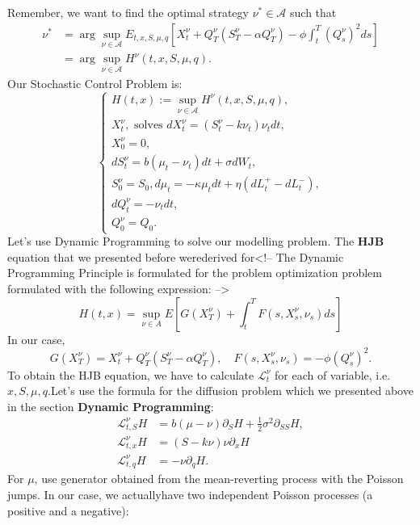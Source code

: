Remember, we want to find the optimal strategy $\nu^* \in \mathcal A$ such that
\begin{align*}
  \nu^* &= \arg\sup_{\nu \in \mathcal A}
  E_{t,x,S,\mu,q}\left[X^\nu_t + Q_T^\nu(S^\nu_T - \alpha Q^\nu_T) - \phi \int_t^T (Q^\nu_s)^2 ds\right]
     \\ &= \arg \sup_{\nu \in \mathcal A}H^\nu(t,x,S,\mu,q).
\end{align*}
Our Stochastic Control Problem is:
\begin{displaymath}
	\begin{cases}
	H(t,x):= \sup_{\nu \in \mathcal A}H^\nu(t,x,S,\mu,q), \\
	X^{\nu}_t,\text{ solves } d X_t^\nu = (S^\nu_t - k \nu_t) \nu_t dt, \\
	X^{\nu}_0 = 0,\\
	dS^\nu_t = b(\mu_t - \nu_t)dt + \sigma dW_t,\\
  S_0^\nu = S_0,
	d\mu_t = -\kappa \mu_t dt + \eta (dL_t^+ - dL_t^-),\\
  dQ^\nu_t = -\nu_t dt,\\
  Q_0^\nu = Q_0.
	\end{cases}
\end{displaymath}
Let's use Dynamic Programming to solve our modelling problem. The \textbf{HJB} equation that we presented before werederived for<!-- The Dynamic Programming Principle is formulated for the problem optimization problem formulated with the following expression: -->
\begin{displaymath}
	H(t,x) = \sup_{\nu \in A} E \left[
	G(X^\nu_T) + \int^T_t F(s,X^\nu_s, \nu_s) ds
	\right]
\end{displaymath}
In our case,
\begin{displaymath}
	G(X^\nu_T) =
	X^\nu_t + Q_T^\nu(S^\nu_T - \alpha Q^\nu_T), \quad
	F(s,X^\nu_s, \nu_s) = -\phi (Q^\nu_s)^2.
\end{displaymath}
To obtain the HJB equation, we have to calculate $\mathcal L^\nu_t$ for each of variable, i.e. $x,S,\mu,q$.Let's use the formula for the diffusion problem which we presented above in the section \textbf{Dynamic Programming}:
\begin{align*}
  \mathcal L^\nu_{t,S}H &= b(\mu-\nu) \partial_S H + \frac{1}{2} \sigma^2 \partial_{SS} H, \\
	\mathcal L^\nu_{t,x}H &= (S-k\nu) \nu \partial_x H \\
	\mathcal L^\nu_{t,q}H &= -\nu \partial_q H.
\end{align*}
For $\mu$, use generator obtained from the mean-reverting process with the Poisson jumps. In our case, we actuallyhave two independent Poisson processes (a positive and a negative):
